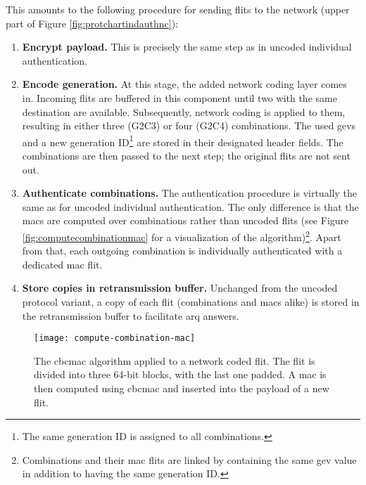 This amounts to the following procedure for sending flits to the network (upper part of Figure \ref{fig:protchartindauthnc}):
\begin{enumerate}
    \item \textbf{Encrypt payload.} This is precisely the same step as in uncoded individual authentication.
    \item \textbf{Encode generation.} At this stage, the added network coding layer comes in. Incoming flits are buffered in this component until two
        with the same destination are available. Subsequently, network coding is applied to them, resulting in either three (G2C3) or four (G2C4)
        combinations. The used \glspl{gev} and a new generation ID\footnote{The same generation ID is assigned to all combinations.} are stored in
        their designated header fields. The combinations are then passed to the next step; the original flits are not sent out.
    \item \textbf{Authenticate combinations.} The authentication procedure is virtually the same as for uncoded individual authentication. The only
        difference is that the \glspl{mac} are computed over combinations rather than uncoded flits (see Figure \vref{fig:computecombinationmac}
        for a visualization of the algorithm)\footnote{Combinations and their \gls{mac} flits are linked by containing the same \gls{gev} value in
        addition to having the same generation ID.}. Apart from that, each outgoing combination is individually authenticated with a dedicated \gls{mac}
        flit.
    \item \textbf{Store copies in retransmission buffer.} Unchanged from the uncoded protocol variant, a copy of each flit (combinations and
        \glspl{mac} alike) is stored in the retransmission buffer to facilitate \gls{arq} answers.
\end{enumerate}
\vspace{0.5\baselineskip}

\begin{figure}
    \centering
    \texttt{[image: compute-combination-mac]}
    \caption[CBC-MAC algorithm applied to a network coded flit]{The \gls{cbcmac} algorithm applied to a network coded flit. The flit is divided into three
    64-bit blocks, with the last one padded. A \gls{mac} is then computed using \gls{cbcmac} and inserted into the payload of a new flit.}
    \label{fig:computecombinationmac}
\end{figure}

